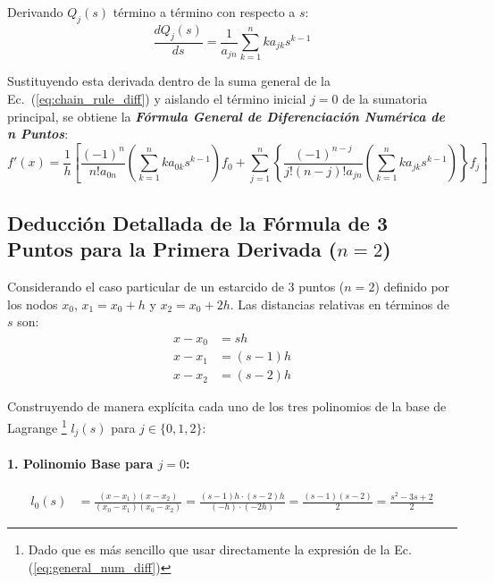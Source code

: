 \documentclass[11pt, a4paper]{article}
\begin{document}
	Derivando $Q_j(s)$ término a término con respecto a $s$:
	\begin{equation}
		\frac{d Q_j(s)}{ds} = \frac{1}{a_{jn}} \sum_{k=1}^{n} k a_{jk} s^{k-1}
	\end{equation}
	
	Sustituyendo esta derivada dentro de la suma general de la Ec.~(\ref{eq:chain_rule_diff}) y aislando el término inicial $j=0$ de la sumatoria principal, se obtiene la \textbf{\textit{Fórmula General de Diferenciación Numérica de n Puntos}}:
	\begin{equation}
		f'(x) = \frac{1}{h} \left[ \frac{(-1)^{n}}{n! a_{0n}} \left( \sum_{k=1}^{n} k a_{0k} s^{k-1} \right) f_0 + \sum_{j=1}^{n} \left\{ \frac{(-1)^{n-j}}{j!(n-j)! a_{jn}} \left( \sum_{k=1}^{n} k a_{jk} s^{k-1} \right) \right\} f_j \right]
		\label{eq:general_num_diff}
	\end{equation}
	
	\subsection{Deducción Detallada de la Fórmula de 3 Puntos para la Primera Derivada ($n=2$)}
	
	Considerando el caso particular de un estarcido de 3 puntos ($n=2$) definido por los nodos $x_0$, $x_1 = x_0 + h$ y $x_2 = x_0 + 2h$. Las distancias relativas en términos de $s$ son:
	\begin{align}
		x - x_0 &= s h \\
		x - x_1 &= (s - 1) h \\
		x - x_2 &= (s - 2) h
	\end{align}
	
	Construyendo de manera explícita cada uno de los tres polinomios de la base de Lagrange \footnote{Dado que es más sencillo que usar directamente la expresión de la Ec. (\ref{eq:general_num_diff})} $l_j(s)$ para $j \in \{0, 1, 2\}$:
	
	\paragraph{1. Polinomio Base para $j=0$:}
	\begin{align}
		l_0(s) &= \frac{(x - x_1)(x - x_2)}{(x_0 - x_1)(x_0 - x_2)} = \frac{(s - 1)h \cdot (s - 2)h}{(-h) \cdot (-2h)} = \frac{(s - 1)(s - 2)}{2} = \frac{s^2 - 3s + 2}{2}
	\end{align}
	
\end{document}
